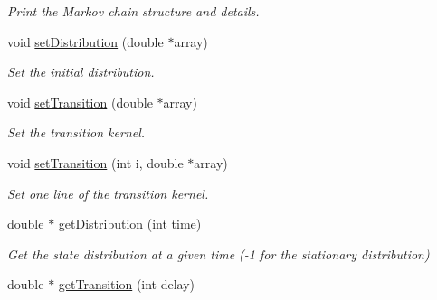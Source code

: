 \begin{DoxyCompactItemize}
\begin{DoxyCompactList}\small\item\em Print the Markov chain structure and details. \end{DoxyCompactList}\item 
void \hyperlink{classMarkovProcess_a2942db4262f73c20cc49bfebaf0df101}{set\-Distribution} (double $\ast$array)
\begin{DoxyCompactList}\small\item\em Set the initial distribution. \end{DoxyCompactList}\item 
void \hyperlink{classMarkovProcess_a687c9c983ac090f2ba40d028c6f04786}{set\-Transition} (double $\ast$array)
\begin{DoxyCompactList}\small\item\em Set the transition kernel. \end{DoxyCompactList}\item 
void \hyperlink{classMarkovProcess_a4e7f19999ca3e6972507b9e0975f1b6b}{set\-Transition} (int i, double $\ast$array)
\begin{DoxyCompactList}\small\item\em Set one line of the transition kernel. \end{DoxyCompactList}\item 
\hypertarget{classMarkovProcess_afa7edaa775112df8dd4fc5007034d7e7}{double $\ast$ \hyperlink{classMarkovProcess_afa7edaa775112df8dd4fc5007034d7e7}{get\-Distribution} (int time)}\label{classMarkovProcess_afa7edaa775112df8dd4fc5007034d7e7}

\begin{DoxyCompactList}\small\item\em Get the state distribution at a given time (-\/1 for the stationary distribution) \end{DoxyCompactList}\item 
\hypertarget{classMarkovProcess_a39c87840da9b238d7c33bd5ad23d538d}{double $\ast$ \hyperlink{classMarkovProcess_a39c87840da9b238d7c33bd5ad23d538d}{get\-Transition} (int delay)}\label{classMarkovProcess_a39c87840da9b238d7c33bd5ad23d538d}


\end{DoxyCompactItemize}
